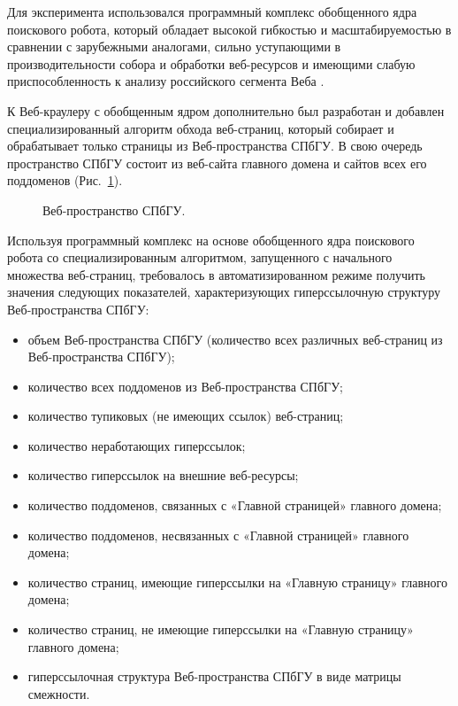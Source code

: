  Для эксперимента использовался программный комплекс обобщенного ядра поискового робота, который обладает высокой гибкостью и масштабируемостью в сравнении с зарубежными аналогами, сильно уступающими в производительности собора и обработки веб-ресурсов и имеющими слабую приспособленность к анализу российского сегмента Веба \cite{BlekanovSergeevMartynenko}. 
 
 К Веб-краулеру с обобщенным ядром дополнительно был разработан и добавлен специализированный алгоритм обхода веб-страниц, который собирает и обрабатывает только страницы из Веб-пространства СПбГУ. В свою очередь пространство СПбГУ состоит из веб-сайта главного домена и сайтов всех его поддоменов (Рис.~\cref{fig:spbuWebSpace}).
 
\begin{figure}[ht]
    \caption{Веб-пространство СПбГУ.}\label{fig:spbuWebSpace}
\end{figure}

Используя программный комплекс на основе обобщенного ядра поискового робота со специализированным алгоритмом, запущенного с начального множества веб-страниц, требовалось в автоматизированном режиме получить значения следующих показателей, характеризующих гиперссылочную структуру Веб-пространства СПбГУ:
\begin{itemize}
	\item объем Веб-пространства СПбГУ (количество всех различных веб-страниц из Веб-пространства СПбГУ);
	\item количество всех поддоменов из Веб-пространства СПбГУ; 
	\item количество тупиковых (не имеющих ссылок) веб-страниц; 
	\item количество неработающих гиперссылок; 
	\item количество гиперссылок на внешние веб-ресурсы; 
	\item количество поддоменов, связанных с «Главной страницей» главного домена; 
	\item количество поддоменов, несвязанных с «Главной страницей» главного домена; 
	\item количество страниц, имеющие гиперссылки на «Главную страницу» главного домена; 
	\item количество страниц, не имеющие гиперссылки на «Главную страницу» главного домена; 
	\item гиперссылочная структура Веб-пространства СПбГУ в виде матрицы смежности. 
\end{itemize}

